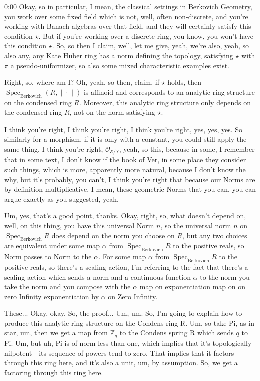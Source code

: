 \begin{unfinished}{0:00}
Okay, so in particular, I mean, the classical settings in Berkovich Geometry, you work over some fixed field which is not, well, often non-discrete, and you're working with Banach algebras over that field, and they will certainly satisfy this condition $\star$. But if you're working over a discrete ring, you know, you won't have this condition $\star$. So, so then I claim, well, let me give, yeah, we're also, yeah, so also any, any Kate Huber ring has a norm defining the topology, satisfying $\star$ with $\pi$ a pseudo-uniformizer, so also some mixed characteristic examples exist.

Right, so, where am I? Oh, yeah, so then, claim, if $\star$ holds, then $\operatorname{Spec}_{\mathrm{Berkovich}} (R, \|\cdot\|)$ is affinoid and corresponds to an analytic ring structure on the condensed ring $R$. Moreover, this analytic ring structure only depends on the condensed ring $R$, not on the norm satisfying $\star$.

I think you're right, I think you're right, I think you're right, yes, yes, yes. So similarly for a morphism, if it is only with a constant, you could still apply the same thing. I think you're right, $\mathcal{O}_{\mathcal{E}/\mathcal{S}}$, yeah, so this, because in some, I remember that in some text, I don't know if the book of Ver, in some place they consider such things, which is more, apparently more natural, because I don't know the why, but it's probably, you can't, I think you're right that because our Norms are by definition multiplicative, I mean, these geometric Norms that you can, you can argue exactly as you suggested, yeah.

Um, yes, that's a good point, thanks. Okay, right, so, what doesn't depend on, well, on this thing, you have this universal Norm $n$, so the universal norm $n$ on $\operatorname{Spec}_{\mathrm{Berkovich}} R$ does depend on the norm you choose on $R$, but any two choices are equivalent under some map $\alpha$ from $\operatorname{Spec}_{\mathrm{Berkovich}} R$ to the positive reals, so Norm passes to Norm to the $\alpha$. For some map $\alpha$ from $\operatorname{Spec}_{\mathrm{Berkovich}} R$ to the positive reals, so there's a scaling action, I'm referring to the fact that there's a scaling action which sends a norm and a continuous function $\alpha$ to the norm you take the norm and you compose with the $\alpha$ map on exponentiation map on on zero Infinity exponentiation by $\alpha$ on Zero Infinity.

These... Okay, okay. So, the proof... Um, um. So, I'm going to explain how to produce this analytic ring structure on the Condens ring R. Um, so take Pi, as in star, um, then we get a map from $\mathbb{Z}_q$ to the Condens spring R which sends $q$ to Pi. Um, but uh, Pi is of norm less than one, which implies that it's topologically nilpotent - its sequence of powers tend to zero. That implies that it factors through this ring here, and it's also a unit, um, by assumption. So, we get a factoring through this ring here.


\end{unfinished}
